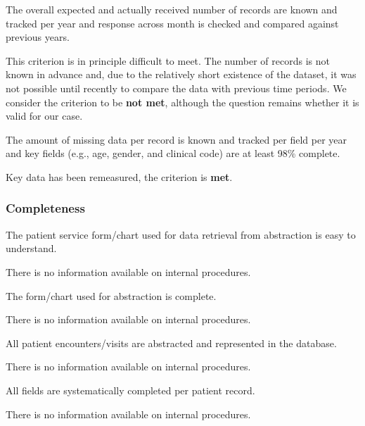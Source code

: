 \begin{QandA}
    \item The overall expected and actually received number of records are known and tracked per year and response across month is checked and compared against previous years.
    \begin{answered}
        This criterion is in principle difficult to meet.
        The number of records is not known in advance and, due to the relatively short existence of the dataset, it was not possible until recently to compare the data with previous time periods.
        We consider the criterion to be \textbf{not met}, although the question remains whether it is valid for our case.
    \end{answered}

    \item The amount of missing data per record is known and tracked per field per year and key fields (e.g., age, gender, and clinical code) are at least 98\% complete.
    \begin{answered}
        Key data has been remeasured, the criterion is \textbf{met}.
    \end{answered}

\end{QandA}

\subsubsection{Completeness}

\begin{QandA}
    \item The patient service form/chart used for data retrieval from abstraction is easy to understand.
    \begin{answered}
        There is no information available on internal procedures.
    \end{answered}

    \item The form/chart used for abstraction is complete.
    \begin{answered}
        There is no information available on internal procedures.
    \end{answered}

    \item All patient encounters/visits are abstracted and represented in the database.
    \begin{answered}
        There is no information available on internal procedures.
    \end{answered}

    \item All fields are systematically completed per patient record.
    \begin{answered}
        There is no information available on internal procedures.
    \end{answered}

\end{QandA}

